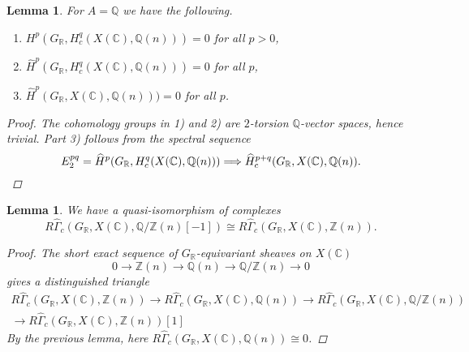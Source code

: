 \documentclass[leqno,12pt]{article}
\theoremstyle{plain}
\newtheorem{lemma}[theorem]{\indent\sc Lemma}
\theoremstyle{definition}
\newcommand{\ZZ}{\mathbb{Z}}
\newcommand{\QQ}{\mathbb{Q}}
\newcommand{\RR}{\mathbb{R}}
\newcommand{\CC}{\mathbb{C}}
\begin{document}
\begin{lemma}
  For $A = \QQ$ we have the following.

  \begin{enumerate}
  \item[$1)$] $H^p (G_\RR, H_c^q (X (\CC), \QQ (n))) = 0$ for all $p > 0$,

  \item[$2)$] $\widehat{H}^p (G_\RR, H_c^q (X (\CC), \QQ (n))) = 0$ for all $p$,

  \item[$3)$] $\widehat{H}^p (G_\RR, X (\CC), \QQ (n))) = 0$ for all $p$.
  \end{enumerate}

  \begin{proof}
    The cohomology groups in 1) and 2) are $2$-torsion $\QQ$-vector spaces,
    hence trivial. Part 3) follows from the spectral sequence
    \[ E_2^{pq} = \widehat{H}^p (G_\RR, H^q_c (X (\CC), \QQ (n)))
    \Longrightarrow
    \widehat{H}^{p+q}_c (G_\RR, X (\CC), \QQ (n)). \qedhere \]
  \end{proof}
\end{lemma}

\begin{lemma}
  We have a quasi-isomorphism of complexes
  \[ R\widehat{\Gamma}_c (G_\RR, X (\CC), \QQ/\ZZ (n) [-1]) \cong
  R\widehat{\Gamma}_c (G_\RR, X (\CC), \ZZ (n)).\]

  \begin{proof}
    The short exact sequence of $G_\RR$-equivariant sheaves on $X (\CC)$
    $$0 \to \ZZ (n) \to \QQ (n) \to \QQ/\ZZ (n) \to 0$$
    gives a distinguished triangle
    \begin{multline*}
      R\widehat{\Gamma}_c (G_\RR, X (\CC), \ZZ (n)) \to
      R\widehat{\Gamma}_c (G_\RR, X (\CC), \QQ (n)) \to
      R\widehat{\Gamma}_c (G_\RR, X (\CC), \QQ/\ZZ (n)) \\
      \to R\widehat{\Gamma}_c (G_\RR, X (\CC), \ZZ (n)) [1]
    \end{multline*}
    By the previous lemma, here
    $R\widehat{\Gamma}_c (G_\RR, X (\CC), \QQ (n)) \cong 0$.
  \end{proof}
\end{lemma}
\end{document}

